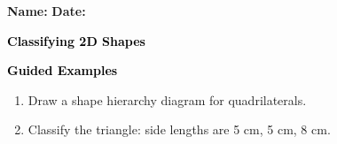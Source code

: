 \documentclass[12pt, letterpaper, fleqn]{article}
\begin{document}
\textbf{Name:} \underline{\hspace{5cm}}
\hfill
\textbf{Date:} \underline{\hspace{3cm}}\\

\begin{tcolorbox}[colback=customteal!20]
    \large\textcolor{black}{\textbf{Classifying 2D Shapes}}
\end{tcolorbox}
\newpage
\begin{tcolorbox}[colback=customteal!20]
    \large\textcolor{black}{\textbf{Guided Examples}}
\end{tcolorbox}
\begin{enumerate}[itemsep=3.5cm, leftmargin=0.6cm]
\item Draw a shape hierarchy diagram for quadrilaterals.
\vspace{4cm}
\item Classify the triangle: side lengths are 5 cm, 5 cm, 8 cm.
\end{enumerate}
\end{document}
